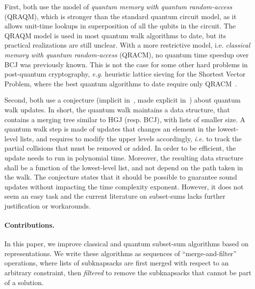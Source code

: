 First, both use the model of \emph{quantum memory with quantum random-access} (QRAQM), which is stronger than the standard quantum circuit model, as it allows unit-time lookups in superposition of all the qubits in the circuit. The QRAQM model is used in most quantum walk algorithms to date, but its practical realizations are still unclear. With a more restrictive model, i.e. \emph{classical memory with quantum random-access} (QRACM), no quantum time speedup over BCJ was previously known. This is not the case for some other hard problems in post-quantum cryptography, \emph{e.g.} heuristic lattice sieving for the Shortest Vector Problem, where the best quantum algorithms to date require only QRACM~\cite{laarhoven2015search}.

Second, both use a conjecture (implicit in~\cite{DBLP:conf/pqcrypto/BernsteinJLM13}, made explicit in~\cite{DBLP:conf/tqc/HelmM18}) about quantum walk updates. In short, the quantum walk maintains a data structure, that contains a merging tree similar to HGJ (resp. BCJ), with lists of smaller size. A quantum walk step is made of updates that changes an element in the lowest-level lists, and requires to modify the upper levels accordingly, \emph{i.e.} to track the partial collisions that must be removed or added. In order to be efficient, the update needs to run in polynomial time. Moreover, the resulting data structure shall be a function of the lowest-level list, and not depend on the path taken in the walk. The conjecture states that it should be possible to guarantee sound updates without impacting the time complexity exponent. However, it does not seem an easy task and the current literature on subset-sums lacks further justification or workarounds.




\paragraph{Contributions.}
In this paper, we improve classical and quantum subset-sum algorithms based on representations. We write these algorithms as sequences of ``merge-and-filter'' operations, where lists of subknapsacks are first merged with respect to an arbitrary constraint, then \emph{filtered} to remove the subknapsacks that cannot be part of a solution.

